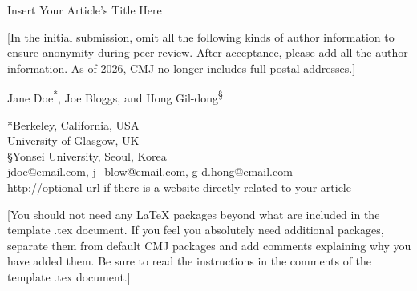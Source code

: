 \documentclass[letterpaper, 12pt]{article}
\begin{document}
{\cmjTitle Insert Your Article's Title Here}
\vspace*{24pt}

[In the initial submission, omit all the following kinds of author information to ensure anonymity during peer review.
After acceptance, please add all the author information. As of 2026, CMJ no longer includes full postal addresses.]


					              {\cmjAuthor Jane Doe\textsuperscript{*}, Joe Bloggs\textsuperscript{\dag}, and Hong Gil-dong\textsuperscript{\S}} 


 
 \begin{cmjAuthorAddress}
	*Berkeley, California, USA	 \\
	{\dag	}University of Glasgow, UK \\
	{\S}Yonsei University, Seoul, Korea \\
	jdoe@email.com, j\_blow@email.com, g-d.hong@email.com \\
	http://optional-url-if-there-is-a-website-directly-related-to-your-article
 \end{cmjAuthorAddress}

[You should not need any LaTeX packages beyond what are included in the template .tex document.
If you feel you absolutely need additional packages, separate them from default CMJ packages and add comments
explaining why you have added them.
Be sure to read the instructions in the comments of the template .tex document.]

\begin{abstract}
Insert abstract here, typically about 150--200 words.
\end{abstract}
\end{document}
